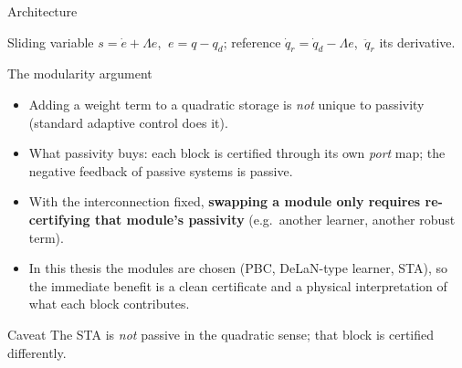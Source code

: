 \documentclass[aspectratio=169,10pt]{beamer}
\newcommand{\dq}{\dot q}
\begin{document}
\begin{frame}{Architecture}
\begin{center}
\end{center}
\vspace{-2mm}
\small Sliding variable $s=\dot e+\Lambda e$, $\ e=q-q_d$; reference $\dq_r=\dq_d-\Lambda e$, $\ \ddot q_r$ its derivative.
\end{frame}

\begin{frame}{The modularity argument}
\begin{itemize}
\item Adding a weight term to a quadratic storage is \emph{not} unique to passivity (standard adaptive control does it).
\item What passivity buys: each block is certified through its own \emph{port} map; the negative feedback of passive systems is passive.
\item With the interconnection fixed, \textbf{swapping a module only requires re-certifying that module's passivity} (e.g.\ another learner, another robust term).
\item In this thesis the modules are chosen (PBC, DeLaN-type learner, STA), so the immediate benefit is a clean certificate and a physical interpretation of what each block contributes.
\end{itemize}
\vspace{2mm}
\begin{block}{Caveat}
The STA is \emph{not} passive in the quadratic sense; that block is certified differently.
\end{block}
\end{frame}
\end{document}
